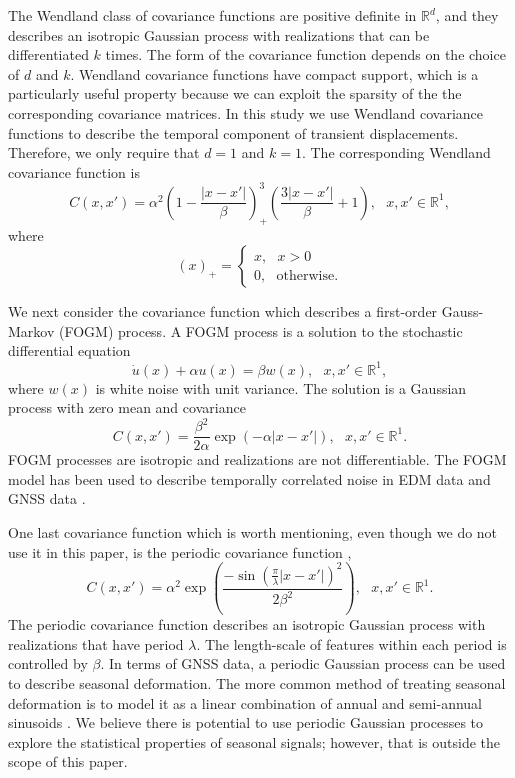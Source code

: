 \documentclass[10pt,a4paper]{article}
\begin{document}
The Wendland class of covariance functions \citep{Wendland2005} are positive definite in $\mathbb{R}^d$, and they describes an isotropic Gaussian process with realizations that can be differentiated $k$ times. The form of the covariance function depends on the choice of $d$ and $k$. Wendland covariance functions have compact support, which is a particularly useful property because we can exploit the sparsity of the the corresponding covariance matrices. In this study we use Wendland covariance functions to describe the temporal component of transient displacements. Therefore, we only require that $d=1$ and $k=1$. The corresponding Wendland covariance function is 
\begin{equation}\label{eq:Wendland}
C(x,x') = \alpha^2\left(1 - \frac{|x - x'|}{\beta}\right)^3_+ \left(\frac{3|x - x'|}{\beta} + 1\right), \ \ \ x,x' \in \mathbb{R}^1,
\end{equation}
where
\begin{equation}
(x)_+ = 
\begin{cases}
x, \ \ \ x > 0 \\
0, \ \ \ \mathrm{otherwise}.
\end{cases}
\end{equation}

We next consider the covariance function which describes a first-order Gauss-Markov (FOGM) process. A FOGM process is a solution to the stochastic differential equation
\begin{equation}
\dot{u}(x) + \alpha u(x) = \beta w(x), \ \ \ x,x' \in \mathbb{R}^1,
\end{equation}
where $w(x)$ is white noise with unit variance.  The solution is a Gaussian process with zero mean and covariance
\begin{equation}\label{eq:FOGM}
C(x,x') = \frac{\beta^2}{2\alpha}\exp\left(-\alpha|x - x'|\right), \ \ \ x,x' \in \mathbb{R}^1. 
\end{equation}
FOGM processes are isotropic and realizations are not differentiable.  The FOGM model has been used to describe temporally correlated noise in EDM data \citep{Langbein2004} and GNSS data \citep[e.g.,][]{Langbein2008}. 

One last covariance function which is worth mentioning, even though we do not use it in this paper, is the periodic covariance function \citep{Mackay1998}, 
\begin{equation}\label{eq:Periodic}
C(x,x') = \alpha^2 \exp\left(\frac{-\sin(\frac{\pi}{\lambda} |x - x'|)^2}{2 \beta^2} \right), \ \ \ x,x' \in \mathbb{R}^1.
\end{equation}
The periodic covariance function describes an isotropic Gaussian process with realizations that have period $\lambda$.  The length-scale of features within each period is controlled by $\beta$. In terms of GNSS data, a periodic Gaussian process can be used to describe seasonal deformation. The more common method of treating seasonal deformation is to model it as a linear combination of annual and semi-annual sinusoids \citep[e.g.,][]{Dong2002}. We believe there is potential to use periodic Gaussian processes to explore the statistical properties of seasonal signals; however, that is outside the scope of this paper.   
\end{document}
